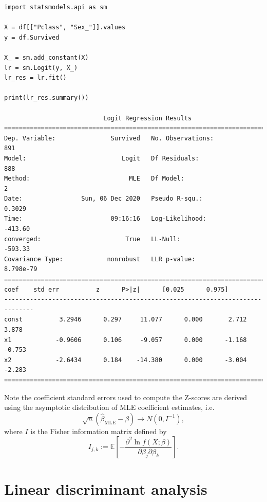 \documentclass[]{article}
\begin{document}
\begin{lstlisting}
import statsmodels.api as sm

X = df[["Pclass", "Sex_"]].values
y = df.Survived

X_ = sm.add_constant(X)
lr = sm.Logit(y, X_)
lr_res = lr.fit()

print(lr_res.summary())

                           Logit Regression Results                           
==============================================================================
Dep. Variable:               Survived   No. Observations:                  891
Model:                          Logit   Df Residuals:                      888
Method:                           MLE   Df Model:                            2
Date:                Sun, 06 Dec 2020   Pseudo R-squ.:                  0.3029
Time:                        09:16:16   Log-Likelihood:                -413.60
converged:                       True   LL-Null:                       -593.33
Covariance Type:            nonrobust   LLR p-value:                 8.798e-79
==============================================================================
coef    std err          z      P>|z|      [0.025      0.975]
------------------------------------------------------------------------------
const          3.2946      0.297     11.077      0.000       2.712       3.878
x1            -0.9606      0.106     -9.057      0.000      -1.168      -0.753
x2            -2.6434      0.184    -14.380      0.000      -3.004      -2.283
==============================================================================
\end{lstlisting}

\noindent Note the coefficient standard errors used to compute the Z-scores are derived using the asymptotic distribution of MLE coefficient estimates, i.e. 
\begin{equation}
\sqrt{n}(\hat{\beta}_{\mathrm{MLE}}-\beta)\rightarrow N(0,I^{-1}),
\end{equation}
where $I$ is the Fisher information matrix defined by
\begin{equation}
I_{j,k}:=\mathbb{E}\left[-\frac{\partial^2 \ln f(X;\beta)}{\partial\beta_j \partial\beta_k} \right].
\end{equation}


\section{Linear discriminant analysis}
\end{document}
